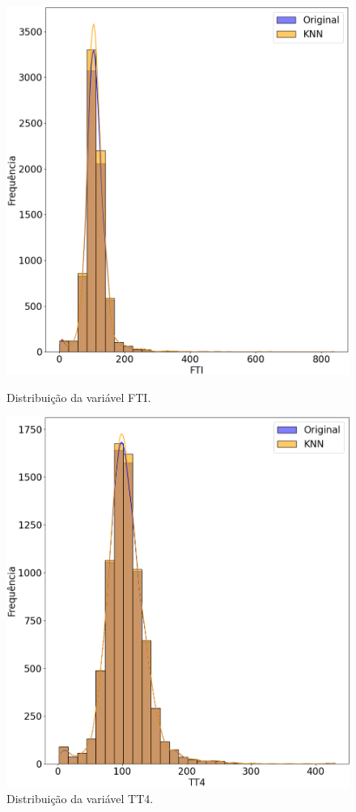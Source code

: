 \documentclass[11pt]{article}
\begin{document}
\begin{figure}[H]
    \centering
    \begin{minipage}{0.48\textwidth}
        \centering
        \includegraphics[width=\textwidth]{img/FTI_distrib.png}
        \caption{Distribuição da variável FTI.}
        \label{fig:FTI_distrib}
    \end{minipage}
    \hfill
    \begin{minipage}{0.48\textwidth}
        \centering
        \includegraphics[width=\textwidth]{img/TT4_distrib.png}
        \caption{Distribuição da variável TT4.}
        \label{fig:TT4_distrib}
    \end{minipage}
\end{figure}
\end{document}
